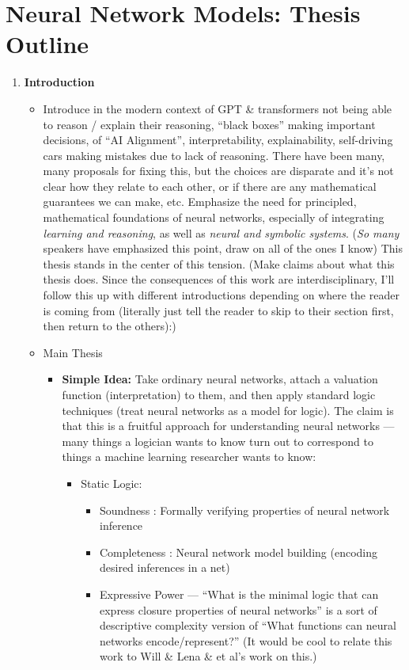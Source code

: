 \documentclass[letterpaper]{article}
\begin{document}
\section*{Neural Network Models: Thesis Outline}

\begin{enumerate}
    \item \textbf{Introduction}
    \begin{itemize}
        \item Introduce in the modern context of GPT \& transformers not being able to reason / explain their reasoning, ``black boxes'' making important decisions, of ``AI Alignment'', interpretability, explainability, self-driving cars making mistakes due to lack of reasoning.  There have been many, many proposals for fixing this, but the choices are disparate and it's not clear how they relate to each other, or if there are any mathematical guarantees we can make, etc.  Emphasize the need for principled, mathematical foundations of neural networks, especially of integrating \emph{learning and reasoning}, as well as \emph{neural and symbolic systems}.  (\emph{So many} speakers have emphasized this point, draw on all of the ones I know)  This thesis stands in the center of this tension.  (Make claims about what this thesis does.  Since the consequences of this work are interdisciplinary, I'll follow this up with different introductions depending on where the reader is coming from (literally just tell the reader to skip to their section first, then return to the others):)
        
        \item Main Thesis
        \begin{itemize}
            \item \textbf{Simple Idea:} Take ordinary neural networks, attach a valuation function (interpretation) to them, and then apply standard logic techniques (treat neural networks as a model for logic).  The claim is that this is a fruitful approach for understanding neural networks --- many things a logician wants to know turn out to correspond to things a machine learning researcher wants to know:
            \begin{itemize}
                \item Static Logic:
                \begin{itemize}
                    \item Soundness : Formally verifying properties of neural network inference
                    \item Completeness : Neural network model building (encoding desired inferences in a net)
                    \item Expressive Power --- ``What is the minimal logic that can express closure properties of neural networks'' is a sort of descriptive complexity version of ``What functions can neural networks encode/represent?'' (It would be cool to relate this work to Will \& Lena \& et al's work on this.)
                \end{itemize}
                

\end{itemize}
\end{itemize}
\end{itemize}
\end{enumerate}
\end{document}
